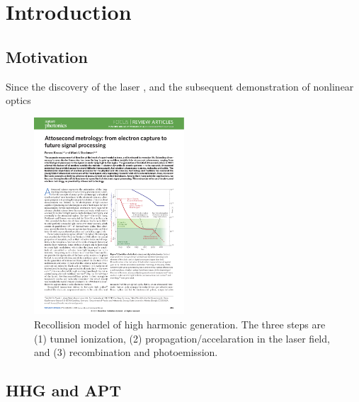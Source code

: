 \chapter{Introduction}
\label{chap:Intro}


\section{Motivation}

Since the discovery of the laser \cite{schawlowInfraredOpticalMasers1958, maimanStimulatedOpticalRadiation1960}, and the subsequent demonstration of nonlinear optics \cite{frankenGenerationOpticalHarmonics1961}

\begin{figure}
	\centering
	\includegraphics[width=0.5\textwidth]{figures/Introduction/Pulse_duration.pdf}
	\caption[Recollision model of high harmonic generation]{Recollision model of high harmonic generation.  The three steps are (1) tunnel ionization, (2) propagation/accelaration in the laser field, and (3) recombination and photoemission.}
	\label{fig:pulse_duartion}
\end{figure}

\section{HHG and APT}
\label{intro_HHG}

